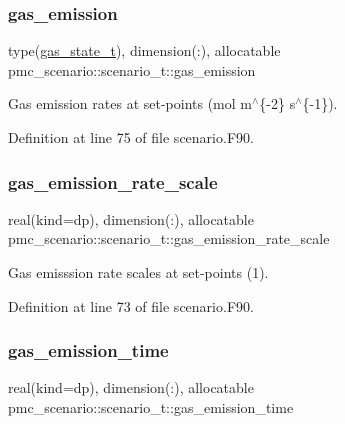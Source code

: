 \subsubsection{\texorpdfstring{gas\+\_\+emission}{gas\_emission}}
{\footnotesize\ttfamily type(\mbox{\hyperlink{structpmc__gas__state_1_1gas__state__t}{gas\+\_\+state\+\_\+t}}), dimension(\+:), allocatable pmc\+\_\+scenario\+::scenario\+\_\+t\+::gas\+\_\+emission}



Gas emission rates at set-\/points (mol m$^\wedge$\{-\/2\} s$^\wedge$\{-\/1\}). 



Definition at line 75 of file scenario.\+F90.

\mbox{\label{structpmc__scenario_1_1scenario__t_a789ee28e6039ccd9ddc28da4bcdfae3c}} 
\subsubsection{\texorpdfstring{gas\+\_\+emission\+\_\+rate\+\_\+scale}{gas\_emission\_rate\_scale}}
{\footnotesize\ttfamily real(kind=dp), dimension(\+:), allocatable pmc\+\_\+scenario\+::scenario\+\_\+t\+::gas\+\_\+emission\+\_\+rate\+\_\+scale}



Gas emisssion rate scales at set-\/points (1). 



Definition at line 73 of file scenario.\+F90.

\mbox{\label{structpmc__scenario_1_1scenario__t_ab1e9b58fcd78362fab28bd8b875e6c9c}} 
\subsubsection{\texorpdfstring{gas\+\_\+emission\+\_\+time}{gas\_emission\_time}}
{\footnotesize\ttfamily real(kind=dp), dimension(\+:), allocatable pmc\+\_\+scenario\+::scenario\+\_\+t\+::gas\+\_\+emission\+\_\+time}



